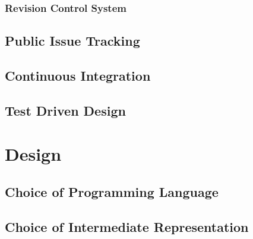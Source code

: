 \documentclass[12pt, a4paper]{article}
\begin{document}

\subsubsection{Revision Control System}


\subsection{Public Issue Tracking}


\subsection{Continuous Integration}


\subsection{Test Driven Design}


\section{Design}


\subsection{Choice of Programming Language}




\subsection{Choice of Intermediate Representation}
\end{document}

